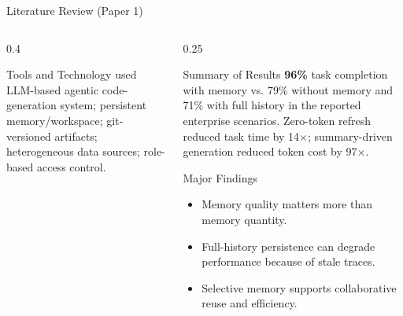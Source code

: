 \begin{frame}{Literature Review (Paper 1)}
\begin{columns}[T]
\begin{column}{0.4\textwidth}
    \begin{block}{Tools and Technology used}
      \tiny LLM-based agentic code-generation system; persistent memory/workspace; git-versioned artifacts; heterogeneous data sources; role-based access control.
    \end{block}
  \end{column}

  \begin{column}{0.25\textwidth}
    \begin{block}{Summary of Results}
      \tiny \textbf{96\%} task completion with memory vs. 79\% without memory and 71\% with full history in the reported enterprise scenarios. Zero-token refresh reduced task time by 14$\times$; summary-driven generation reduced token cost by 97$\times$.
    \end{block}
    \vspace{0.12cm}
    \begin{block}{Major Findings}
      \tiny
      \begin{itemize}\setlength\itemsep{1pt}
      \item Memory quality matters more than memory quantity.
\item Full-history persistence can degrade performance because of stale traces.
\item Selective memory supports collaborative reuse and efficiency.
      \end{itemize}
    \end{block}
  \end{column}
  \end{columns}
\end{frame}

